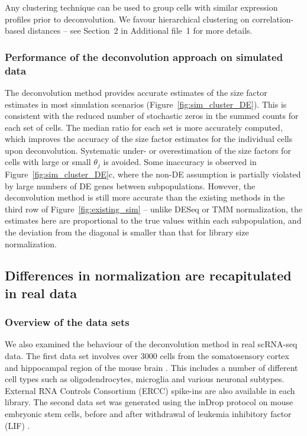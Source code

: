 \documentclass{bmcart}
\newcommand{\suppclustering}{2}
\begin{document}
Any clustering technique can be used to group cells with similar expression profiles prior to deconvolution.
We favour hierarchical clustering on correlation-based distances -- see Section~\suppclustering{} in Additional file~1 for more details.

\subsubsection*{Performance of the deconvolution approach on simulated data}
The deconvolution method provides accurate estimates of the size factor estimates in most simulation scenarios (Figure~\ref{fig:sim_cluster_DE}).
This is consistent with the reduced number of stochastic zeros in the summed counts for each set of cells.
The median ratio for each set is more accurately computed, which improves the accuracy of the size factor estimates for the individual cells upon deconvolution.
Systematic under- or overestimation of the size factors for cells with large or small $\theta_j$ is avoided.
Some inaccuracy is observed in Figure~\ref{fig:sim_cluster_DE}c, where the non-DE assumption is partially violated by large numbers of DE genes between subpopulations.
However, the deconvolution method is still more accurate than the existing methods in the third row of Figure~\ref{fig:existing_sim}
    -- unlike DESeq or TMM normalization, the estimates here are proportional to the true values within each subpopulation, 
       and the deviation from the diagonal is smaller than that for library size normalization.

\subsection*{Differences in normalization are recapitulated in real data}

\subsubsection*{Overview of the data sets}
We also examined the behaviour of the deconvolution method in real scRNA-seq data.
The first data set involves over 3000 cells from the somatosensory cortex and hippocampal region of the mouse brain \cite{zeisel2015brain}.
This includes a number of different cell types such as oligodendrocytes, microglia and various neuronal subtypes.
External RNA Controls Consortium (ERCC) spike-ins are also available in each library.
The second data set was generated using the inDrop protocol on mouse embryonic stem cells, before and after withdrawal of leukemia inhibitory factor (LIF) \cite{klein2015droplet}.
\end{document}
